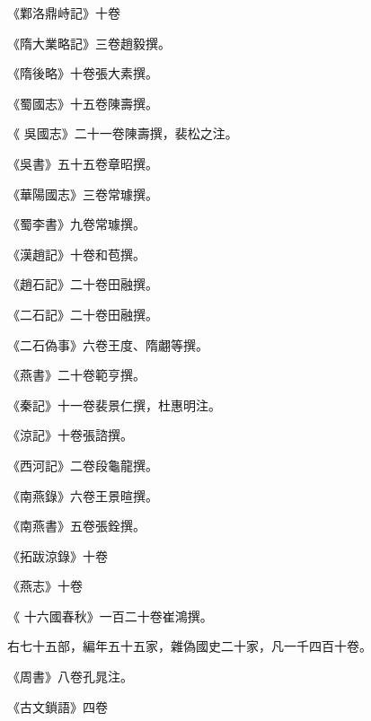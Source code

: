 \begin{pinyinscope}
 《鄴洛鼎峙記》十卷



 《隋大業略記》三卷趙毅撰。



 《隋後略》十卷張大素撰。



 《蜀國志》十五卷陳壽撰。



 《
 吳國志》二十一卷陳壽撰，裴松之注。



 《吳書》五十五卷章昭撰。



 《華陽國志》三卷常璩撰。



 《蜀李書》九卷常璩撰。



 《漢趙記》十卷和苞撰。



 《趙石記》二十卷田融撰。



 《二石記》二十卷田融撰。



 《二石偽事》六卷王度、隋翽等撰。



 《燕書》二十卷範亨撰。



 《秦記》十一卷裴景仁撰，杜惠明注。



 《涼記》十卷張諮撰。



 《西河記》二卷段龜龍撰。



 《南燕錄》六卷王景暄撰。



 《南燕書》五卷張銓撰。



 《拓跋涼錄》十卷



 《燕志》十卷



 《
 十六國春秋》一百二十卷崔鴻撰。



 右七十五部，編年五十五家，雜偽國史二十家，凡一千四百十卷。



 《周書》八卷孔晁注。



 《古文鎖語》四卷




\end{pinyinscope}
